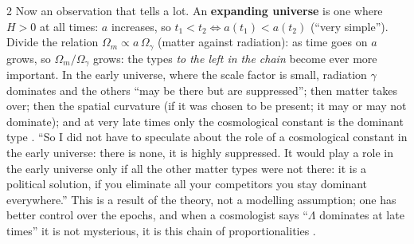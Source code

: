 \begin{paracol}{2}
Now an observation that tells a lot. An \textbf{expanding universe} is one where $H>0$ at all times: $a$ increases, so $t_1<t_2\iff a(t_1)<a(t_2)$ (``very simple''). Divide the relation $\Omega_m\propto a\,\Omega_\gamma$ (matter against radiation): as time goes on $a$ grows, so $\Omega_m/\Omega_\gamma$ grows: the types \emph{to the left in the chain} become ever more important. In the early universe, where the scale factor is small, radiation $\gamma$ dominates and the others ``may be there but are suppressed''; then matter takes over; then the spatial curvature (if it was chosen to be present; it may or may not dominate); and at very late times only the cosmological constant is the dominant type . ``So I did not have to speculate about the role of a cosmological constant in the early universe: there is none, it is highly suppressed. It would play a role in the early universe only if all the other matter types were not there: it is a political solution, if you eliminate all your competitors you stay dominant everywhere.'' This is a result of the theory, not a modelling assumption; one has better control over the epochs, and when a cosmologist says ``$\Lambda$ dominates at late times'' it is not mysterious, it is this chain of proportionalities .


\end{paracol}
